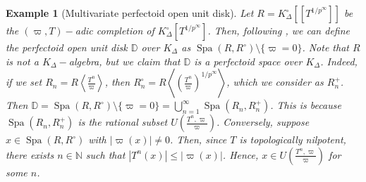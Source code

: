 \documentclass[12pts,a4paper]{amsart}
\newtheorem{example}[proposition]{Example}
\DeclareMathOperator{\spa}{Spa}
\begin{document}
  \begin{example}[Multivariate perfectoid open unit disk]
     Let $R=K^\circ_\Delta[[T^{1/p^\infty}]]$ be the $(\varpi,T)-$adic completion of $K^\circ_\Delta[T^{1/p^\infty}]$. Then, following \cite{Weins}, we can define the \emph{perfectoid open unit disk} $\mathbb{D}$ over $K_\Delta$ as $\spa (R,R^\circ)\setminus \{\varpi=0\}$. Note that $R$ is not a $K_\Delta-$algebra, but we claim that $\mathbb{D}$ is a perfectoid space over $K_\Delta$. Indeed, if we set $R_n=R\left<\frac{T^n}{\varpi}\right>$, then $R^\circ_n=R\left<\left(\frac{T^n}{\varpi}\right)^{1/p^\infty}\right>$, which we consider as $R^+_n$. Then $\mathbb{D}=\spa(R,R^\circ)\setminus\{\varpi=0\}=\bigcup\limits_{n=1}^\infty \spa(R_n,R^+_n)$. This is because $\spa(R_n,R^+_n)$ is the rational subset $U\left(\frac{T^n,\varpi}{\varpi}\right)$. Conversely, suppose $x\in \spa(R,R^\circ)$ with $|\varpi(x)|\neq 0$. Then, since $T$ is topologically nilpotent, there exists $n\in\mathbb{N}$ such that $|T^n(x)|\leq |\varpi(x)|$. Hence, $x\in U\left(\frac{T^n,\varpi}{\varpi}\right)$ for some $n$.
  \end{example}







\end{document}

